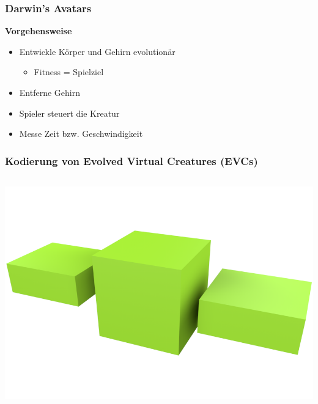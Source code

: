 \documentclass{beamer}
\begin{document}
\begin{frame}
	\frametitle{Darwin's Avatars}
	\textbf{Vorgehensweise}\\ \pause
	\begin{itemize}
		\item Entwickle Körper und Gehirn evolutionär \pause
		\begin{itemize}
			\item Fitness = Spielziel \pause
		\end{itemize} 
		\item Entferne Gehirn \pause
		\item Spieler steuert die Kreatur \pause
		\item Messe Zeit bzw. Geschwindigkeit
	\end{itemize}	
\end{frame}

\begin{frame}
	\frametitle{Kodierung von Evolved Virtual Creatures (EVCs)}
	\begin{columns}[c]
		\centering
		\centering
		\includegraphics[width=\textwidth]{img/1.png}
	\end{columns}
\end{frame}
\end{document}
